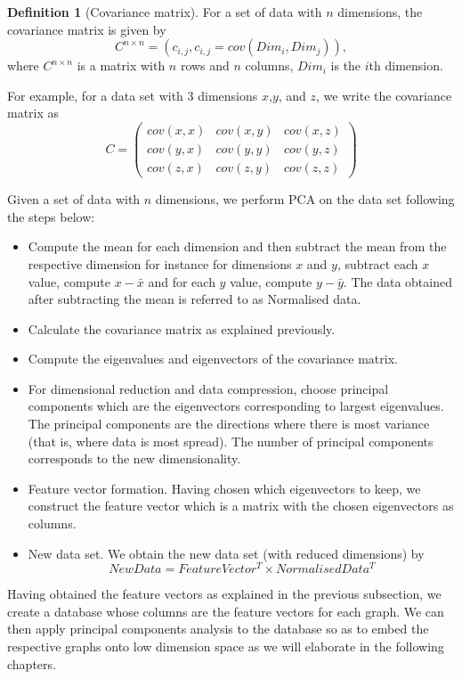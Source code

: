 \documentclass[10pt,a4paper]{article}
\theoremstyle{plain}
\theoremstyle{definition}
\newtheorem{defn}[subsection]{Definition}
\begin{document}
       \begin{defn}[Covariance matrix]
       	For a set of data with $n$ dimensions, the covariance matrix is given by
       	\begin{equation}
       	C^{n \times n} = (c_{i,j}, c_{i,j} = cov(Dim_i, Dim_j)),
       	\end{equation}
       	where $C^{n \times n}$ is a matrix with $n$ rows and $n$ columns, $Dim_i$ is the $i$th dimension. 
       \end{defn}
       For example, for a data set with $3$ dimensions $x$,$y$, and $z$, we write the covariance matrix as
       \begin{equation}
       C = \begin{pmatrix}
       cov(x,x) & cov(x,y) & cov(x,z) \\
       cov(y,x) & cov(y,y) & cov(y,z) \\
       cov(z,x) & cov(z,y) & cov(z,z)
       \end{pmatrix}
       \end{equation}
       
       Given a set of data with $n$ dimensions, we perform PCA on the data set following the steps below:
       \begin{itemize}
       	\item Compute the mean for each dimension and then subtract the mean from the respective dimension for instance for dimensions $x$ and $y$, subtract each $x$ value, compute $x-\bar{x}$ and for each $y$ value, compute $y-\bar{y}$. The data obtained after subtracting the mean is referred to as Normalised data.
       	\item Calculate the covariance matrix as explained previously.
       	\item Compute the eigenvalues and eigenvectors of the covariance matrix.
       	\item For dimensional reduction and data compression, choose principal components which are the eigenvectors corresponding to largest eigenvalues. The principal components are the directions where there is most variance (that is, where data is most spread).
       	The number of principal components corresponds to the new dimensionality.
       	\item Feature vector formation. Having chosen which eigenvectors to keep, we construct the feature vector which is a matrix with the chosen eigenvectors as columns.
       	\item New data set. We obtain the new data set (with reduced dimensions) by 
       	 \begin{equation}
       	 NewData = FeatureVector^T \times NormalisedData^T
       	 \end{equation}
       	
       \end{itemize}
       Having obtained the feature vectors as explained in the previous subsection, we create a database whose columns are the feature vectors for each graph. We can then apply principal components analysis to the database so as to embed the respective graphs onto low dimension space as we will elaborate in the following chapters.
     
\end{document}
